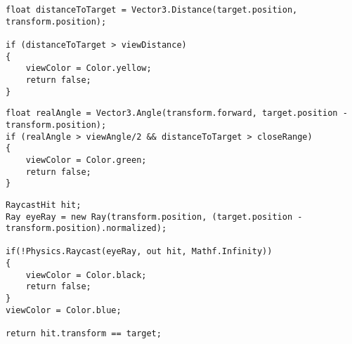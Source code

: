 \documentclass[14pt, titlepage,fleqn,a4paper]{extarticle}
\begin{document}
    
    \begin{lstlisting}[caption= Игрок слишком далеко, label=lst:test]
float distanceToTarget = Vector3.Distance(target.position, transform.position);

if (distanceToTarget > viewDistance)
{
    viewColor = Color.yellow;
    return false;
}

    \end{lstlisting}
    
    \begin{lstlisting}[caption= Игрок слишком далеко, label=lst:test]
float realAngle = Vector3.Angle(transform.forward, target.position - transform.position);
if (realAngle > viewAngle/2 && distanceToTarget > closeRange)
{
    viewColor = Color.green;
    return false;
}
    \end{lstlisting}
    
     \begin{lstlisting}[caption= Игрок за преградой, label=lst:test]
RaycastHit hit;
Ray eyeRay = new Ray(transform.position, (target.position - transform.position).normalized);

if(!Physics.Raycast(eyeRay, out hit, Mathf.Infinity))
{
    viewColor = Color.black;
    return false;
}
viewColor = Color.blue;

return hit.transform == target;

    \end{lstlisting}
    \newpage
\end{document}
